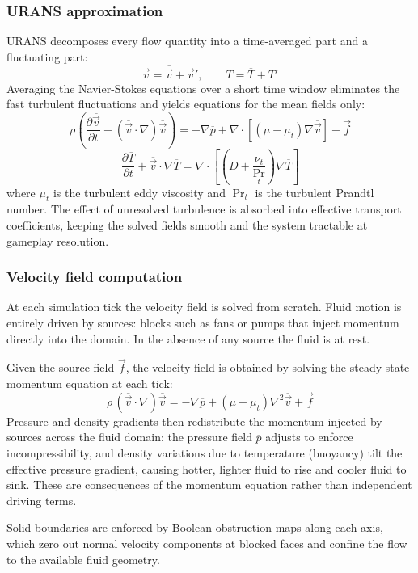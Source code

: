 \documentclass{report}
\begin{document}
\subsubsection*{URANS approximation}

URANS decomposes every flow quantity into a time-averaged part and a fluctuating part:
\[
\vec{v} = \overline{\vec{v}} + \vec{v}', \qquad T = \overline{T} + T'
\]
Averaging the Navier-Stokes equations over a short time window eliminates the fast
turbulent fluctuations and yields equations for the mean fields only:
\[
\rho \left( \frac{\partial \overline{\vec{v}}}{\partial t}
+ (\overline{\vec{v}} \cdot \nabla)\overline{\vec{v}} \right)
= -\nabla \overline{p} + \nabla \cdot \left[(\mu + \mu_t)\nabla \overline{\vec{v}}\right] + \vec{f}
\]
\[
\frac{\partial \overline{T}}{\partial t} + \overline{\vec{v}} \cdot \nabla \overline{T}
= \nabla \cdot \left[\left(D + \frac{\nu_t}{\Pr_t}\right) \nabla \overline{T}\right]
\]
where $\mu_t$ is the turbulent eddy viscosity and $\Pr_t$ is the turbulent Prandtl number.
The effect of unresolved turbulence is absorbed into effective transport coefficients,
keeping the solved fields smooth and the system tractable at gameplay resolution.

\subsubsection*{Velocity field computation}

At each simulation tick the velocity field is solved from scratch. Fluid motion is
entirely driven by sources: blocks such as fans or pumps that inject momentum directly
into the domain. In the absence of any source the fluid is at rest.

Given the source field $\vec{f}$, the velocity field is obtained by solving the
steady-state momentum equation at each tick:
\[
\rho\,(\overline{\vec{v}} \cdot \nabla)\overline{\vec{v}}
= -\nabla \overline{p} + (\mu + \mu_t)\nabla^2 \overline{\vec{v}} + \vec{f}
\]
Pressure and density gradients then redistribute the momentum injected by sources
across the fluid domain: the pressure field $\overline{p}$ adjusts to enforce
incompressibility, and density variations due to temperature (buoyancy) tilt the
effective pressure gradient, causing hotter, lighter fluid to rise and cooler fluid
to sink. These are consequences of the momentum equation rather than independent
driving terms.

Solid boundaries are enforced by Boolean obstruction maps along each axis, which
zero out normal velocity components at blocked faces and confine the flow to the
available fluid geometry.
\end{document}
